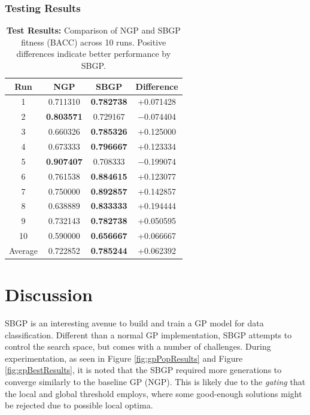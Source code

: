 \documentclass{article}
\begin{document}
\subsubsection{Testing Results}
\begin{table}[H]
\centering
\begin{tabular}{cccc}
\toprule
\textbf{Run} & \textbf{NGP} & \textbf{SBGP} & \textbf{Difference} \\
\midrule
1  & 0.711310 & \textbf{0.782738} & +0.071428 \\
2  & \textbf{0.803571} & 0.729167 & $-$0.074404 \\
3  & 0.660326 & \textbf{0.785326} & +0.125000 \\
4  & 0.673333 & \textbf{0.796667} & +0.123334 \\
5  & \textbf{0.907407} & 0.708333 & $-$0.199074 \\
6  & 0.761538 & \textbf{0.884615} & +0.123077 \\
7  & 0.750000 & \textbf{0.892857} & +0.142857 \\
8  & 0.638889 & \textbf{0.833333} & +0.194444 \\
9  & 0.732143 & \textbf{0.782738} & +0.050595 \\
10 & 0.590000 & \textbf{0.656667} & +0.066667 \\
\midrule
Average & 0.722852 & \textbf{0.785244} & +0.062392 \\
\bottomrule
\end{tabular}
\caption{\textbf{Test Results:} Comparison of NGP and SBGP fitness (BACC) across 10 runs. Positive differences indicate better performance by SBGP.}
\label{tab:bacc_comparison}
\end{table}

\section{Discussion}
\label{discussion}
SBGP is an interesting avenue to build and train a GP model for data classification. Different than a normal GP implementation, SBGP attempts to control the search space, but comes with a number of challenges. During experimentation, as seen in Figure \ref{fig:gpPopResults} and Figure \ref{fig:gpBestResults}, it is noted that the SBGP required more generations to converge similarly to the baseline GP (NGP). This is likely due to the \emph{gating} that the local and global threshold employs, where some good-enough solutions might be rejected due to possible local optima.
\end{document}
